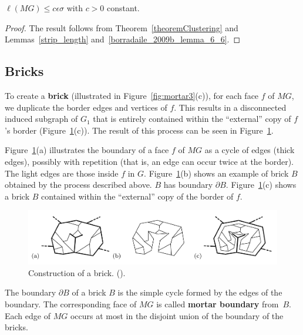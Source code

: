 \begin{lemma} \label{length_mg}
     \(\ell(MG) \leq c \epsilon \sigma\) with \(c > 0\) constant.
\end{lemma}
\begin{proof}
    The result follows from Theorem~\ref{theoremClustering} and Lemmas~\ref{strip_length} and~\ref{borradaile_2009b_lemma_6_6}.
\end{proof}

\subsection{Bricks}

To create a \textbf{brick} (illustrated in  Figure~\ref{fig:mortar3}(c)), for each face \(f\) of \(MG\), we duplicate the border edges and vertices of \(f\). This results in a disconnected induced subgraph of \(G_1\) that is entirely contained within the ``external'' copy of \(f\)'s border (Figure~\ref{fig:mortar4}(c)). The result of this process can be seen in Figure~\ref{fig:mortar4}.

Figure~\ref{fig:mortar4}(a) illustrates the boundary of a face \(f\) of \(MG\) as a cycle of edges (thick edges), possibly with repetition (that is, an edge can occur twice at the border). The light edges are those inside \(f\) in \(G\). Figure~\ref{fig:mortar4}(b) shows an example of brick \(B\) obtained by the process described above. \(B\) has boundary \(\partial B\). Figure~\ref{fig:mortar4}(c) shows a brick \(B\) contained within the ``external'' copy of the border of \(f\).

\begin{figure}[h]
    \centering
    \includegraphics[scale=0.45]{imgs/mortar4.png}
    \caption{Construction of a brick. (\cite{Borradaile2009b}).}
    \label{fig:mortar4}
\end{figure}

The boundary \(\partial B\) of a brick \(B\) is the simple cycle formed by the edges of the boundary. The corresponding face of \(MG\) is called \textbf{mortar boundary} from~\(B\). Each edge of \(MG\) occurs at most in the disjoint union of the boundary of the bricks.

